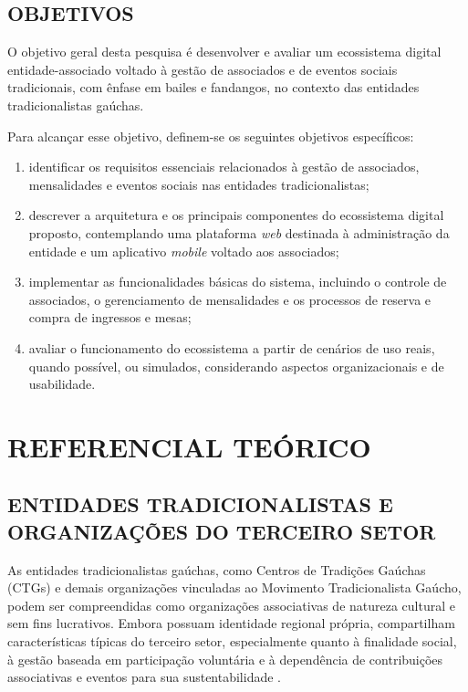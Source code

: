 ﻿\documentclass[12pt,a4paper]{article}
\begin{document}
\subsection{OBJETIVOS}

O objetivo geral desta pesquisa é desenvolver e avaliar um ecossistema digital entidade-associado voltado à gestão de associados e de eventos sociais tradicionais, com ênfase em bailes e fandangos, no contexto das entidades tradicionalistas gaúchas.

Para alcançar esse objetivo, definem-se os seguintes objetivos específicos:

\begin{enumerate}[label=\alph*)]
    \item identificar os requisitos essenciais relacionados à gestão de associados, mensalidades e eventos sociais nas entidades tradicionalistas;
    \item descrever a arquitetura e os principais componentes do ecossistema digital proposto, contemplando uma plataforma \textit{web} destinada à administração da entidade e um aplicativo \textit{mobile} voltado aos associados;
    \item implementar as funcionalidades básicas do sistema, incluindo o controle de associados, o gerenciamento de mensalidades e os processos de reserva e compra de ingressos e mesas;
    \item avaliar o funcionamento do ecossistema a partir de cenários de uso reais, quando possível, ou simulados, considerando aspectos organizacionais e de usabilidade.
\end{enumerate}

\section{REFERENCIAL TEÓRICO}

\subsection{ENTIDADES TRADICIONALISTAS E ORGANIZAÇÕES DO TERCEIRO SETOR}

As entidades tradicionalistas gaúchas, como Centros de Tradições Gaúchas (CTGs) e demais organizações vinculadas ao Movimento Tradicionalista Gaúcho, podem ser compreendidas como organizações associativas de natureza cultural e sem fins lucrativos. Embora possuam identidade regional própria, compartilham características típicas do terceiro setor, especialmente quanto à finalidade social, à gestão baseada em participação voluntária e à dependência de contribuições associativas e eventos para sua sustentabilidade \citep{uliana2019}.
\end{document}
